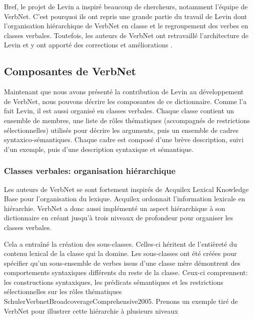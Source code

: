 Bref, le projet de Levin a inspiré beaucoup de chercheurs, notamment l'équipe de VerbNet. C'est pourquoi ils ont repris une grande partie du travail de Levin dont l'organisation hiérarchique de VerbNet en classe et le regroupement des verbes en classes verbales. Toutefois, les auteurs de VerbNet ont retravaillé l'architecture de Levin et y ont apporté des corrections et améliorations \citep{verbnet.2006}.

\subsection {Composantes de VerbNet}  

Maintenant que nous avons présenté la contribution de Levin au développement de VerbNet, nous pouvons décrire les composantes de ce dictionnaire. Comme l'a fait Levin, il est aussi organisé en classes verbales. Chaque classe contient un ensemble de membres, une liste de rôles thématiques (accompagnés de restrictions sélectionnelles) utilisés pour décrire les arguments, puis un ensemble de cadres syntaxico-sémantiques. Chaque cadre est composé d'une brève description, suivi d'un exemple, puis d'une description syntaxique et sémantique\citep{SchulerVerbnetBroadcoverageComprehensive2005}.

\subsubsection{Classes verbales: organisation hiérarchique}

Les auteurs de VerbNet se sont fortement inspirés de Acquilex Lexical Knowledge Base \citep{CopestakeACQUILEXLKBrepresentation1992} pour l'organisation du lexique. Acquilex ordonnait l'information lexicale en hiérarchie. VerbNet a donc aussi implémenté un aspect hiérarchique à son dictionnaire en créant jusqu'à trois niveaux de profondeur pour organiser les classes verbales. 

Cela a entraîné la création des sous-classes. Celles-ci héritent de l'entièreté du contenu lexical de la classe qui la domine. Les sous-classes ont été créées pour spécifier qu'un sous-ensemble de verbes issus d'une classe mère démontrent des comportements syntaxiques différents du reste de la classe. Ceux-ci comprennent: les constructions syntaxiques, les prédicats sémantiques et les restrictions sélectionnelles sur les rôles thématiques {SchulerVerbnetBroadcoverageComprehensive2005}. Prenons un exemple tiré de VerbNet pour illustrer cette hiérarchie à plusieurs niveaux 

